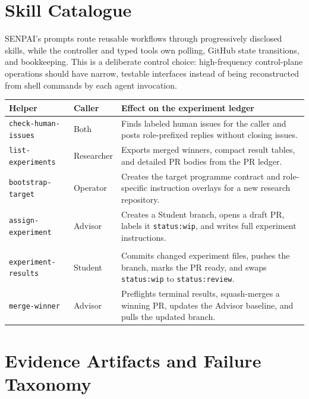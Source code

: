 \documentclass{article}
\begin{document}
\section{Skill Catalogue}
\label{app:skill-catalogue}

SENPAI's prompts route reusable workflows through progressively disclosed skills, while the controller and typed tools own polling, GitHub state transitions, and bookkeeping. This is a deliberate control choice: high-frequency control-plane operations should have narrow, testable interfaces instead of being reconstructed from shell commands by each agent invocation.

\begin{center}
  \label{tab:skill-catalogue}
  \small
  \begin{tabular}{@{}p{}p{}p{}@{}}
    \toprule
    Helper & Caller & Effect on the experiment ledger \\
    \midrule
    \texttt{check-human-issues} & Both & Finds labeled human issues for the caller and posts role-prefixed replies without closing issues. \\
    \texttt{list-experiments} & Researcher & Exports merged winners, compact result tables, and detailed PR bodies from the PR ledger. \\
    \texttt{bootstrap-target} & Operator & Creates the target programme contract and role-specific instruction overlays for a new research repository. \\
    \texttt{assign-experiment} & Advisor & Creates a Student branch, opens a draft PR, labels it \texttt{status:wip}, and writes full experiment instructions. \\
    \shortstack[l]{\texttt{submit-}\\\texttt{experiment-results}} & Student & Commits changed experiment files, pushes the branch, marks the PR ready, and swaps \texttt{status:wip} to \texttt{status:review}. \\
    \texttt{merge-winner} & Advisor & Preflights terminal results, squash-merges a winning PR, updates the Advisor baseline, and pulls the updated branch. \\
    \bottomrule
  \end{tabular}
\end{center}

\section{Evidence Artifacts and Failure Taxonomy}
\label{app:evidence-taxonomy}
\end{document}
